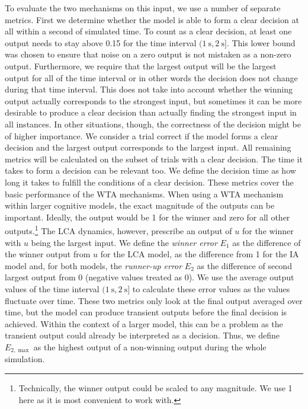 \documentclass[10pt,letterpaper]{article}
\begin{document}
To evaluate the two mechanisms on this input, we use a number of separate metrics.
First we determine whether the model is able to form a clear decision at all within a second of simulated time.
To count as a clear decision, at least one output needs to stay above 0.15 for the time interval
$(\SI{1}{\second}, \SI{2}{\second}]$. %
This lower bound was chosen to ensure that noise on a zero output is not mistaken as a non-zero output.
Furthermore, we require that the largest output will be the largest output for all of the time interval or in other words the decision does not change during that time interval.
This does not take into account whether the winning output actually corresponds to the strongest input, but sometimes it can be more desirable to produce a clear decision than actually finding the strongest input in all instances.
In other situations, though, the correctness of the decision might be of higher importance.
We consider a trial correct if the model forms a clear decision and the largest output corresponds to the largest input.
All remaining metrics will be calculated on the subset of trials with a clear decision.
The time it takes to form a decision can be relevant too.
We define the decision time as how long it takes to fulfill the conditions of a clear decision.
These metrics cover the basic performance of the WTA mechanisms.
When using a WTA mechanism within larger cognitive models, the exact magnitude of the outputs can be important.
Ideally, the output would be 1 for the winner and zero for all other outputs.\footnote{Technically, the winner output could be scaled     to any magnitude.
We use 1 here as it is most convenient to work with.} The LCA dynamics, however, prescribe an output of $u$ for the winner with $u$ being the largest input.
We define the \emph{winner error} $E_1$ as the difference of the winner output from $u$ for the LCA model, as the difference from 1 for the IA model and, for both models, the \emph{runner-up error} $E_2$ as the difference of second largest output from 0 (negative values treated as 0).
We use the average output values of the time   interval
 $(\SI{1}{\second}, \SI{2}{\second}]$ %
to calculate these error values as the values fluctuate over time.
These two metrics only look at the final output averaged over time, but the model can produce transient outputs before the final decision is achieved.
Within the context of a larger model, this can be a problem as the transient output could already be interpreted as a decision.
Thus, we define $E_{2,\max}$ 
as the highest output of a non-winning output during the whole simulation.
\end{document}
